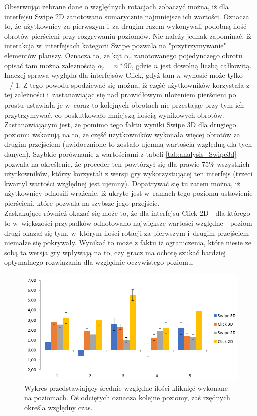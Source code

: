 \documentclass[a4paper,12pt,numbers=noenddot]{report}
\begin{document}
Obserwując zebrane dane o względnych rotacjach zobaczyć można, iż dla interfejsu Swipe 2D zanotowano sumarycznie najmniejsze ich wartości. Oznacza to, że użytkownicy za pierwszym i~za drugim razem wykonywali podobną ilość obrotów pierścieni przy rozgrywaniu poziomów. Nie należy jednak zapominać, iż interakcja w~interfejsach kategorii Swipe pozwala na "przytrzymywanie" elementów planszy. Oznacza to, że kąt $\alpha_r$ zanotowanego pojedynczego obrotu opisać tam można zależnością $\alpha_r = n * 90$, gdzie $n$ jest dowolną liczbą całkowitą. Inaczej sprawa wygląda dla interfejsów Click, gdyż tam $n$ wynosić może tylko +/-1. Z tego powodu spodziewać się można, iż część użytkowników korzystała z tej zależności i~zastanawiając się nad prawidłowym ułożeniem pierścieni po prostu ustawiała je w~coraz to kolejnych obrotach nie przestając przy tym ich przytrzymywać, co poskutkowało mniejszą ilością wynikowych obrotów. \\
Zastanawiającym jest, że pomimo tego faktu wyniki Swipe 3D dla drugiego poziomu wskazują na to, że część użytkowników wykonała więcej obrotów za drugim przejściem (uwidocznione to zostało ujemną wartością względną dla tych danych). Szybkie porównanie z wartościami z tabeli \ref{tab:analysis_Swipe3d} pozwala na określenie, że proceder ten powtórzył się dla prawie 75\% wszystkich użytkowników, którzy korzystali z wersji gry wykorzystującej ten interfejs (trzeci kwartyl wartości względnej jest ujemny). Dopatrywać się tu zatem można, iż użytkownicy odnosili wrażenie, iż ukryte jest w~ramach tego poziomu ustawienie pierścieni, które pozwala na szybsze jego przejście. \\
Zaskakujące również okazać się może to, że dla interfejsu Click 2D - dla którego to w~większości przypadków odnotowano największe wartości względne - poziom drugi okazał się tym, w~którym ilości rotacji za pierwszym i~drugim przejściem niemalże się pokrywały. Wynikać to może z faktu iż ograniczenia, które niesie ze sobą ta wersja gry wpływają na to, czy gracz ma ochotę szukać bardziej optymalnego rozwiązania dla względnie oczywistego poziomu.

\begin{figure}[h!]
	\centering
  	\includegraphics[width=0.9\linewidth]{diag/rel_mean_Clicks.png}
	\caption{Wykres przedstawiający średnie względne ilości kliknięć wykonane na poziomach. Oś odciętych oznacza kolejne poziomy, zaś rzędnych określa względny czas.}
	\label{fig:diag:rel:mean_Clicks}
\end{figure}
\end{document}
